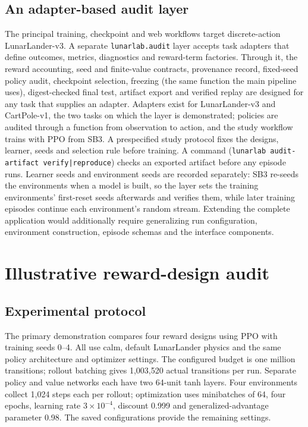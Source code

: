 \documentclass[preprint,12pt]{elsarticle}
\begin{document}
\subsection{An adapter-based audit layer}
The principal training, checkpoint and web workflows target discrete-action LunarLander-v3. A separate \texttt{lunarlab.audit} layer accepts task adapters that define outcomes, metrics, diagnostics and reward-term factories. Through it, the reward accounting, seed and finite-value contracts, provenance record, fixed-seed policy audit, checkpoint selection, freezing (the same function the main pipeline uses), digest-checked final test, artifact export and verified replay are designed for any task that supplies an adapter. Adapters exist for LunarLander-v3 and CartPole-v1, the two tasks on which the layer is demonstrated; policies are audited through a function from observation to action, and the study workflow trains with PPO from SB3. A prespecified study protocol fixes the designs, learner, seeds and selection rule before training. A command (\texttt{lunarlab audit-artifact verify|reproduce}) checks an exported artifact before any episode runs. Learner seeds and environment seeds are recorded separately: SB3 re-seeds the environments when a model is built, so the layer sets the training environments' first-reset seeds afterwards and verifies them, while later training episodes continue each environment's random stream. Extending the complete application would additionally require generalizing run configuration, environment construction, episode schemas and the interface components.

\section{Illustrative reward-design audit}
\subsection{Experimental protocol}
The primary demonstration compares four reward designs using PPO \citep{schulman2017ppo} with training seeds 0--4. All use calm, default LunarLander physics and the same policy architecture and optimizer settings. The configured budget is one million transitions; rollout batching gives 1,003,520 actual transitions per run. Separate policy and value networks each have two 64-unit tanh layers. Four environments collect 1,024 steps each per rollout; optimization uses minibatches of 64, four epochs, learning rate $3\times10^{-4}$, discount 0.999 and generalized-advantage parameter 0.98. The saved configurations provide the remaining settings.
\end{document}
